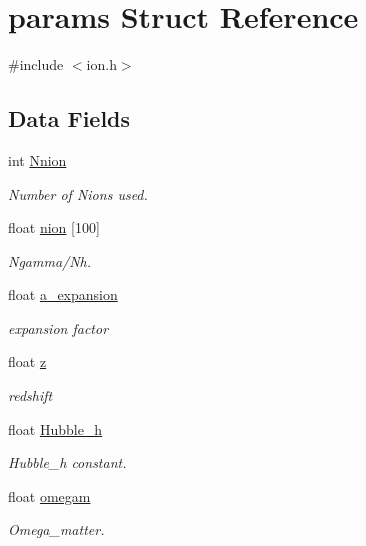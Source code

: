 \hypertarget{structparams}{\section{params Struct Reference}
\label{structparams}
}


{\ttfamily \#include $<$ion.\+h$>$}

\subsection*{Data Fields}
\begin{DoxyCompactItemize}
\item 
int \hyperlink{structparams_ab6d8d0b2c7ee385271e90e51818623bc}{Nnion}
\begin{DoxyCompactList}\small\item\em Number of Nions used. \end{DoxyCompactList}\item 
float \hyperlink{structparams_adad540bcd9d58ccb6cf0dfa257febb93}{nion} \mbox{[}100\mbox{]}
\begin{DoxyCompactList}\small\item\em Ngamma/\+Nh. \end{DoxyCompactList}\item 
float \hyperlink{structparams_ab8ae1614d88a1fdcded37c8573053e9c}{a\+\_\+expansion}
\begin{DoxyCompactList}\small\item\em expansion factor \end{DoxyCompactList}\item 
float \hyperlink{structparams_af73583b1e980b0aa03f9884812e9fd4d}{z}
\begin{DoxyCompactList}\small\item\em redshift \end{DoxyCompactList}\item 
float \hyperlink{structparams_a341cbdda601613d5625f64bb60871f69}{Hubble\+\_\+h}
\begin{DoxyCompactList}\small\item\em Hubble\+\_\+h constant. \end{DoxyCompactList}\item 
float \hyperlink{structparams_a1143ccc333b13b81d68f112fc1122acd}{omegam}
\begin{DoxyCompactList}\small\item\em Omega\+\_\+matter. \end{DoxyCompactList}\item 

\end{DoxyCompactItemize}
